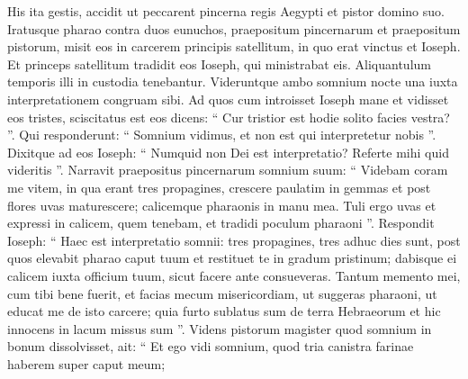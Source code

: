 \begin{biblechapter}
\begin{biblechapter}
\begin{biblechapter}
\begin{biblechapter}
\begin{biblechapter}
\begin{biblechapter}
\begin{biblechapter}
\begin{biblechapter}
\begin{biblechapter}
\begin{biblechapter}
\begin{biblechapter}
\begin{biblechapter}
\begin{biblechapter}
\begin{biblechapter}
\begin{biblechapter}
\begin{biblechapter}
\begin{biblechapter}
\begin{biblechapter}
\begin{biblechapter}
\begin{biblechapter}
\begin{biblechapter}
\begin{biblechapter}
\begin{biblechapter}
\begin{biblechapter}
\begin{biblechapter}
\begin{biblechapter}
\begin{biblechapter}
\begin{biblechapter}
\begin{biblechapter}
\begin{biblechapter}
\begin{biblechapter}
\begin{biblechapter}
\begin{biblechapter}
\begin{biblechapter}
\begin{biblechapter}
\begin{biblechapter}
\begin{biblechapter}
\begin{biblechapter}
\begin{biblechapter}
\begin{biblechapter}
\verse His ita gestis, accidit ut peccarent pincerna regis Aegypti et pistor domino suo. 
\verse Iratusque pharao contra duos eunuchos, praepositum pincernarum et praepositum pistorum, 
\verse misit eos in carcerem principis satellitum, in quo erat vinctus et Ioseph. 
\verse Et princeps satellitum tradidit eos Ioseph, qui ministrabat eis. Aliquantulum temporis illi in custodia tenebantur.
 \verse Videruntque ambo somnium nocte una iuxta interpretationem congruam sibi. 
\verse Ad quos cum introisset Ioseph mane et vidisset eos tristes, 
\verse sciscitatus est eos dicens: “ Cur tristior est hodie solito facies vestra? ”. 
\verse Qui responderunt: “ Somnium vidimus, et non est qui interpretetur nobis ”. Dixitque ad eos Ioseph: “ Numquid non Dei est interpretatio? Referte mihi quid videritis ”.
 \verse Narravit praepositus pincernarum somnium suum: “ Videbam coram me vitem, 
 \verse in qua erant tres propagines, crescere paulatim in gemmas et post flores uvas maturescere; 
\verse calicemque pharaonis in manu mea. Tuli ergo uvas et expressi in calicem, quem tenebam, et tradidi poculum pharaoni ”. 
\verse Respondit Ioseph: “ Haec est interpretatio somnii: tres propagines, tres adhuc dies sunt, 
 \verse post quos elevabit pharao caput tuum et restituet te in gradum pristinum; dabisque ei calicem iuxta officium tuum, sicut facere ante consueveras. 
\verse Tantum memento mei, cum tibi bene fuerit, et facias mecum misericordiam, ut suggeras pharaoni, ut educat me de isto carcere; 
\verse quia furto sublatus sum de terra Hebraeorum et hic innocens in lacum missus sum ”.
 \verse Videns pistorum magister quod somnium in bonum dissolvisset, ait: “ Et ego vidi somnium, quod tria canistra farinae haberem super caput meum; 

\end{biblechapter}
\end{biblechapter}
\end{biblechapter}
\end{biblechapter}
\end{biblechapter}
\end{biblechapter}
\end{biblechapter}
\end{biblechapter}
\end{biblechapter}
\end{biblechapter}
\end{biblechapter}
\end{biblechapter}
\end{biblechapter}
\end{biblechapter}
\end{biblechapter}
\end{biblechapter}
\end{biblechapter}
\end{biblechapter}
\end{biblechapter}
\end{biblechapter}
\end{biblechapter}
\end{biblechapter}
\end{biblechapter}
\end{biblechapter}
\end{biblechapter}
\end{biblechapter}
\end{biblechapter}
\end{biblechapter}
\end{biblechapter}
\end{biblechapter}
\end{biblechapter}
\end{biblechapter}
\end{biblechapter}
\end{biblechapter}
\end{biblechapter}
\end{biblechapter}
\end{biblechapter}
\end{biblechapter}
\end{biblechapter}
\end{biblechapter}
